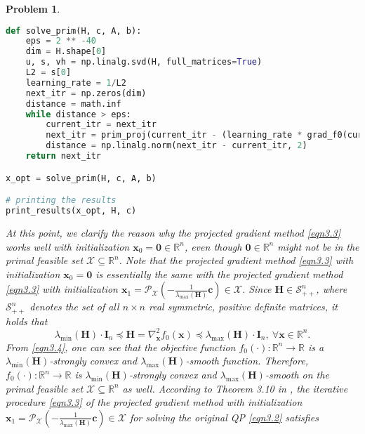 \documentclass[11pt]{article}
\newtheorem{problem}{Problem}
\begin{document}
\begin{problem}
{\begin{lstlisting}[language = Python]
def solve_prim(H, c, A, b):
    eps = 2 ** -40
    dim = H.shape[0]
    u, s, vh = np.linalg.svd(H, full_matrices=True)
    L2 = s[0]
    learning_rate = 1/L2
    next_itr = np.zeros(dim)
    distance = math.inf
    while distance > eps:
        current_itr = next_itr
        next_itr = prim_proj(current_itr - (learning_rate * grad_f0(current_itr, H, c)), A, b)
        distance = np.linalg.norm(next_itr - current_itr, 2)
    return next_itr

x_opt = solve_prim(H, c, A, b)

# printing the results
print_results(x_opt, H, c)
\end{lstlisting}

\indent At this point, we clarify the reason why the projected gradient method \eqref{eqn3.3} works well with initialization $\mathbf{x}_0 = \mathbf{0} \in \mathbb{R}^n$, even though $\mathbf{0} \in \mathbb{R}^n$ might not be in the primal feasible set $\mathcal{X} \subseteq \mathbb{R}^n$. Note that the projected gradient method \eqref{eqn3.3} with initialization $\mathbf{x}_0 = \mathbf{0}$ is essentially the same with the projected gradient method \eqref{eqn3.3} with initialization $\mathbf{x}_1 = \mathcal{P}_{\mathcal{X}} \left( - \frac{1}{\lambda_{\max} (\mathbf{H})} \mathbf{c} \right) \in \mathcal{X}$. Since $\mathbf{H} \in \mathcal{S}_{++}^n$, where $\mathcal{S}_{++}^n$ denotes the set of all $n \times n$ real symmetric, positive definite matrices, it holds that
\begin{equation}
    \label{eqn3.4}
    \lambda_{\min} (\mathbf{H}) \cdot \mathbf{I}_n \preceq \mathbf{H} = \nabla_{\mathbf{x}}^2 f_0 (\mathbf{x}) \preceq \lambda_{\max} (\mathbf{H}) \cdot \mathbf{I}_n,\ \forall \mathbf{x} \in \mathbb{R}^n.
\end{equation}
From \eqref{eqn3.4}, one can see that the objective function $f_0(\cdot) : \mathbb{R}^n \rightarrow \mathbb{R}$ is a $\lambda_{\min} (\mathbf{H})$-strongly convex and $\lambda_{\max} (\mathbf{H})$-smooth function. Therefore, $f_0(\cdot) : \mathbb{R}^n \rightarrow \mathbb{R}$ is $\lambda_{\min} (\mathbf{H})$-strongly convex and $\lambda_{\max} (\mathbf{H})$-smooth on the \emph{primal feasible set} $\mathcal{X} \subseteq \mathbb{R}^n$ as well. According to \emph{Theorem 3.10} in \cite{bubeck2015optimization}, the iterative procedure \eqref{eqn3.3} of the projected gradient method with initialization $\mathbf{x}_1 = \mathcal{P}_{\mathcal{X}} \left( - \frac{1}{\lambda_{\max} (\mathbf{H})} \mathbf{c} \right) \in \mathcal{X}$ for solving the original QP \eqref{eqn3.2} satisfies
}
\end{problem}
\end{document}
